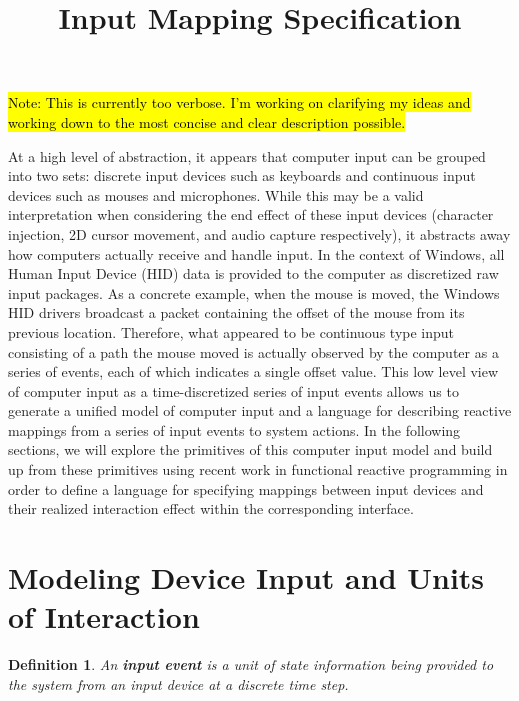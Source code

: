 \documentclass{article}
\title{Input Mapping Specification}
\newtheorem{define}{Definition}
\begin{document}
\maketitle
\thispagestyle{firststyle}

\hl{Note: This is currently too verbose.
I'm working on clarifying my ideas and working down to the most concise and clear description possible.}

At a high level of abstraction, it appears that computer input can be grouped into two sets: discrete input devices such as keyboards and continuous input devices such as mouses and microphones.
While this may be a valid interpretation when considering the end effect of these input devices (character injection, 2D cursor movement, and audio capture respectively), it abstracts away how computers actually receive and handle input. In the context of Windows, all Human Input Device (HID) data is provided to the computer as discretized raw input packages. As a concrete example, when the mouse is moved, the Windows HID drivers broadcast a packet containing the offset of the mouse from its previous location. Therefore, what appeared to be continuous type input consisting of a path the mouse moved is actually observed by the computer as a series of events, each of which indicates a single offset value. This low level view of computer input as a time-discretized series of input events allows us to generate a unified model of computer input and a language for describing reactive mappings from a series of input events to system actions. In the following sections, we will explore the primitives of this computer input model and build up from these primitives using recent work in functional reactive programming in order to define a language for specifying mappings between input devices and their realized interaction effect within the corresponding interface.

\section{Modeling Device Input and Units of Interaction}

\begin{define}
\label{def:event}
An \textbf{input event} is a unit of state information being provided to the system from an input device at a discrete time step.
\end{define}
\end{document}
